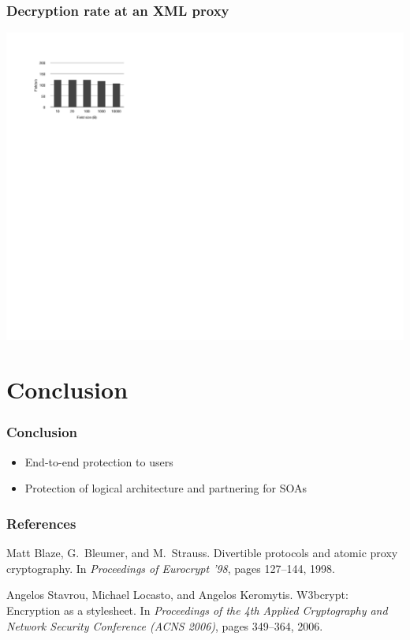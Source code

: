 \documentclass{beamer}
\begin{document}
\begin{frame}
\frametitle{Decryption rate at an XML proxy}
\begin{center}
\includegraphics{server_decrypt} \\
\end{center}
\end{frame}

\section{Conclusion}
\begin{frame}
\frametitle{Conclusion}
\begin{itemize}
\item End-to-end protection to users 
\item Protection of logical architecture and partnering for SOAs
\end{itemize}
\end{frame}

\begin{frame}
\frametitle{References}
\begin{thebibliography}{10}

Matt Blaze, G.~Bleumer, and M.~Strauss.
\newblock Divertible protocols and atomic proxy cryptography.
\newblock In {\em Proceedings of Eurocrypt '98}, pages 127--144, 1998.

Angelos Stavrou, Michael Locasto, and Angelos Keromytis.
\newblock W3bcrypt: Encryption as a stylesheet.
\newblock In {\em Proceedings of the 4th Applied Cryptography and Network
  Security Conference (ACNS 2006)}, pages 349--364, 2006.
\end{thebibliography}
\end{frame}
\end{document}
